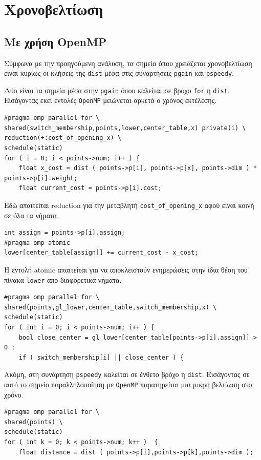 \documentclass{article}
\begin{document}
\section{Χρονοβελτίωση}
\subsection{Με χρήση OpenMP}
Σύμφωνα με την προηγούμενη ανάλυση, τα σημεία όπου χρειάζεται χρονοβελτίωση είναι κυρίως οι κλήσεις της \texttt{dist} μέσα στις συναρτήσεις \texttt{pgain} και \texttt{pspeedy}.

Δύο είναι τα σημεία μέσα στην \texttt{pgain} όπου καλείται σε βρόχο \texttt{for} η \texttt{dist}. Εισάγοντας εκεί εντολές \texttt{OpenMP} μειώνεται αρκετά ο χρόνος εκτέλεσης.
\begin{lstlisting}
#pragma omp parallel for \
shared(switch_membership,points,lower,center_table,x) private(i) \
reduction(+:cost_of_opening_x) \
schedule(static)
for ( i = 0; i < points->num; i++ ) {
    float x_cost = dist ( points->p[i], points->p[x], points->dim ) * points->p[i].weight;
    float current_cost = points->p[i].cost;
\end{lstlisting}
Εδώ απαιτείται reduction για την μεταβλητή \texttt{cost\_of\_opening\_x} αφού είναι κοινή σε όλα τα νήματα.

\begin{lstlisting}
int assign = points->p[i].assign;
#pragma omp atomic
lower[center_table[assign]] += current_cost - x_cost;
\end{lstlisting}
Η εντολή atomic απαιτείται για να αποκλειστούν ενημερώσεις στην ίδια θέση του πίνακα \texttt{lower} απο διαφορετικά νήματα.

\begin{lstlisting}
#pragma omp parallel for \
shared(points,gl_lower,center_table,switch_membership,x) \
schedule(static)
for ( int i = 0; i < points->num; i++ ) {
    bool close_center = gl_lower[center_table[points->p[i].assign]] > 0 ;
    if ( switch_membership[i] || close_center ) {
\end{lstlisting}

Ακόμη, στη συνάρτηση \texttt{pspeedy} καλείται σε ένθετο βρόχο η \texttt{dist}. Εισάγοντας σε αυτό το σημείο παραλληλοποίηση με \texttt{OpenMP} παρατηρείται μια μικρή βελτίωση στο χρόνο.

\begin{lstlisting}
#pragma omp parallel for \
shared(points) \
schedule(static)
for ( int k = 0; k < points->num; k++ )  {
    float distance = dist ( points->p[i],points->p[k],points->dim );
\end{lstlisting}
\end{document}
